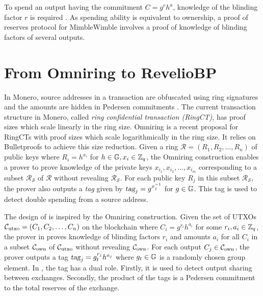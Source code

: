 To spend an output having the commitment $C = g^r h^a$, knowledge of the blinding factor $r$ is required \cite{GrinDocOnGithub}. As spending ability is equivalent to ownership, a proof of reserves protocol for MimbleWimble involves a proof of knowledge of blinding factors of several outputs.


\section{From Omniring to \textnormal{{\selectfont RevelioBP}}}
In Monero, source addresses in a transaction are obfuscated using ring signatures and the amounts are hidden in Pedersen commitments \cite{Noether2016}. 
The current transaction structure in Monero, called \textit{ring confidential transaction (RingCT)}, has proof sizes which scale linearly in the ring size. Omniring \cite{Lai2019} is a recent proposal for RingCTs with proof sizes which scale logarithmically in the ring size. It relies on Bulletproofs \cite{Bunz2018} to achieve this size reduction. Given a ring $\mathcal{R} = (R_1, R_2,\ldots,R_n)$ of public keys where $R_i = h^{x_i}$ for $h \in \mathbb{G}, x_i \in \mathbb{Z}_q$, the Omniring construction enables a prover to prove knowledge of the private keys $x_{i_1}, x_{i_2},\ldots,x_{i_m}$ corresponding to a subset $\mathcal{R}_{\mathcal{S}}$ of $\mathcal{R}$ without revealing $\mathcal{R}_{\mathcal{S}}$. For each public key $R_j$ in this subset $\mathcal{R}_{\mathcal{S}}$, the prover also outputs a \textit{tag} given by $\textsl{tag}_j = g^{x_j^{-1}}$ for $g \in \mathbb{G}$. This tag is used to detect double spending from a source address.

The design of \RB is inspired by the Omniring construction. Given the set of UTXOs $\mathcal{C}_{\text{utxo}}=(C_1,C_2,\ldots,C_n)$ on the blockchain where $C_i = g^{r_i}h^{a_i}$ for some $r_i, a_i \in \mathbb{Z}_q$, the prover in \RPlus proves knowledge of blinding factors $r_i$ and amounts $a_i$ for all $C_i$ in a subset $\mathcal{C}_{\text{own}}$ of $\mathcal{C}_{\text{utxo}}$ without revealing $\mathcal{C}_{\text{own}}$. For each output $C_j \in \mathcal{C}_{\text{own}}$, the prover outputs a tag $\textsl{tag}_j = g_t^{r_j}h^{a_j}$ where $g_t \in \mathbb{G}$ is a randomly chosen group element. In \Rplus, the tag has a dual role. Firstly, it is used to detect output sharing between exchanges. Secondly, the product of the tags is a Pedersen commitment to the total reserves of the exchange.

